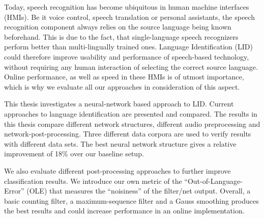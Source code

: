 
\Abstract
Today, speech recognition has become ubiquitous in human machine interfaces (HMIs). Be it voice control, speech translation or personal assistants, the speech recognition component always relies on the source language being known beforehand. This is due to the fact, that single-language speech recognizers perform better than multi-lingually trained ones. Language Identification  (LID) could therefore improve usability and performance of speech-based technology, without requiring any human interaction of selecting the correct source language. Online performance, as well as speed in these HMIs is of utmost importance, which is why we evaluate all our approaches in consideration of this aspect.

This thesis investigates a neural-network based approach to LID. Current approaches to language identification are presented and compared. The results in this thesis compare different network structures, different audio preprocessing and network-post-processing. Three different data corpora are used to verify results with different data sets. The best neural network structure gives a relative improvement of 18\% over our baseline setup.

We also evaluate different post-processing approaches to further improve classification results. We introduce our own metric of the ``Out-of-Language-Error'' (OLE) that measures the ``noisiness'' of the filter/net output. Overall, a basic counting filter, a maximum-sequence filter and a Gauss smoothing produces the best results and could increase performance in an online implementation.



